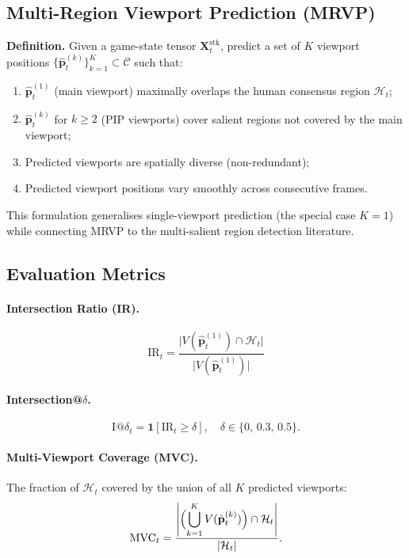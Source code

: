 \documentclass[preprint,12pt]{elsarticle}
\begin{document}
\subsection{Multi-Region Viewport Prediction (MRVP)}

\textbf{Definition.} Given a game-state tensor $\mathbf{X}^{\text{stk}}_t$, 
predict a set of $K$ viewport positions 
$\{\hat{\mathbf{p}}^{(k)}_t\}_{k=1}^{K} \subset \mathcal{C}$ such that:
\begin{enumerate}
  \item $\hat{\mathbf{p}}^{(1)}_t$ (main viewport) maximally overlaps the 
        human consensus region $\mathcal{H}_t$;
  \item $\hat{\mathbf{p}}^{(k)}_t$ for $k \ge 2$ (PIP viewports) cover 
        salient regions not covered by the main viewport;
  \item Predicted viewports are spatially diverse (non-redundant);
  \item Predicted viewport positions vary smoothly across consecutive frames.
\end{enumerate}

This formulation generalises single-viewport prediction (the special case 
$K=1$) while connecting MRVP to the multi-salient region detection literature.

\subsection{Evaluation Metrics}

\paragraph{Intersection Ratio (IR).}
\begin{equation}
  \text{IR}_t = \frac{\bigl|V(\hat{\mathbf{p}}^{(1)}_t) \cap \mathcal{H}_t\bigr|}
                     {\bigl|V(\hat{\mathbf{p}}^{(1)}_t)\bigr|}
  \label{eq:ir}
\end{equation}

\paragraph{Intersection@$\delta$.}
\begin{equation}
  \text{I@}\delta_t = \mathbf{1}[\text{IR}_t \ge \delta],\quad
  \delta \in \{0,\, 0.3,\, 0.5\}.
  \label{eq:iat}
\end{equation}

\paragraph{Multi-Viewport Coverage (MVC).}
The fraction of $\mathcal{H}_t$ covered by the union of all $K$ predicted 
viewports:
\begin{equation}
  \text{MVC}_t = \frac{\displaystyle\left|\Bigl(\bigcup_{k=1}^{K} 
    V(\hat{\mathbf{p}}^{(k)}_t)\Bigr) \cap \mathcal{H}_t\right|}
    {|\mathcal{H}_t|}.
  \label{eq:mvc}
\end{equation}
\end{document}
